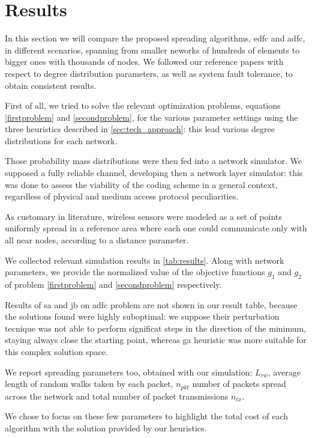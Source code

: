 \documentclass[12pt,journal,draftclsnofoot,onecolumn]{IEEEtran}
\begin{document}
\section{Results} \label{sec:results}
In this section we will compare the proposed spreading algorithms, \gls{edfc} and \gls{adfc}, in different scenarios, spanning from smaller neworks of hundreds of elements to bigger ones with thousands of nodes.
We followed our reference papers \cite{Lin2007} \cite{Aly2008} with respect to degree distribution parameters, as well as system fault tolerance, to obtain consistent results.

First of all, we tried to solve the relevant optimization problems, equations \eqref{firstproblem} and \eqref{secondproblem}, for the various parameter settings using the three heuristics described in \autoref{sec:tech_approach}: this lead various degree distributions for each network.

Those probability mass distributions were then fed into a network simulator.
We supposed a fully reliable channel, developing then a network layer simulator: this was done to assess the viability of the coding scheme in a general context, regardless of physical and medium access protocol peculiarities.

As customary in literature, wireless sensors were modeled as a set of points uniformly spread in a reference area where each one could communicate only with all near nodes, according to a distance parameter.

\bigbreak

We collected relevant simulation results in \autoref{tab:results}.
Along with network parameters, we provide the normalized value of the objective functions $g_1$ and $g_2$ of problem \eqref{firstproblem} and \eqref{secondproblem} respectively.

Results of \gls{sa} and \gls{jb} on \gls{adfc} problem are not shown in our result table, because the solutions found were highly suboptimal: we suppose their perturbation tecnique was not able to perform significat steps in the direction of the minimum, staying always close the starting point, whereas \gls{ga} heuristic was more suitable for this complex solution space.

We report spreading parameters too, obtained with our simulation: $L_{rw}$, average length of random walks taken by each packet, $n_{pkt}$ number of packets spread across the network and total number of packet transmissions $n_{tx}$.

We chose to focus on these few parameters to highlight the total cost of each algorithm with the solution provided by our heuristics.
\end{document}
